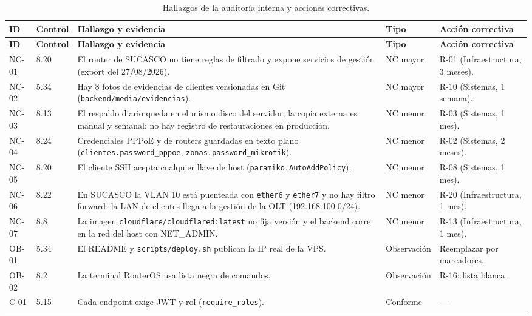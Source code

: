 {\small
\begin{longtable}{L{1.0cm}L{1.0cm}L{6.1cm}L{2.0cm}L{3.1cm}}
\caption{Hallazgos de la auditoría interna y acciones correctivas.}\label{tab:ce03-sgsi-hallazgos}\\
\toprule
\textbf{ID} & \textbf{Control} & \textbf{Hallazgo y evidencia} & \textbf{Tipo} & \textbf{Acción correctiva} \\
\midrule
\endfirsthead
\toprule
\textbf{ID} & \textbf{Control} & \textbf{Hallazgo y evidencia} & \textbf{Tipo} & \textbf{Acción correctiva} \\
\midrule
\endhead
\bottomrule
\endlastfoot
NC-01 & 8.20 & El router de SUCASCO no tiene reglas de filtrado y expone servicios de gestión (export del 27/08/2026). & NC mayor & R-01 (Infraestructura, 3 meses). \\
NC-02 & 5.34 & Hay 8 fotos de evidencias de clientes versionadas en Git (\texttt{backend/media/evidencias}). & NC mayor & R-10 (Sistemas, 1 semana). \\
NC-03 & 8.13 & El respaldo diario queda en el mismo disco del servidor; la copia externa es manual y semanal; no hay registro de restauraciones en producción. & NC menor & R-03 (Sistemas, 1 mes). \\
NC-04 & 8.24 & Credenciales PPPoE y de routers guardadas en texto plano (\texttt{clientes.password\_pppoe}, \texttt{zonas.password\_mikrotik}). & NC menor & R-02 (Sistemas, 2 meses). \\
NC-05 & 8.20 & El cliente SSH acepta cualquier llave de host (\texttt{paramiko.AutoAddPolicy}). & NC menor & R-08 (Sistemas, 1 mes). \\
NC-06 & 8.22 & En SUCASCO la VLAN 10 está puenteada con \texttt{ether6} y \texttt{ether7} y no hay filtro forward: la LAN de clientes llega a la gestión de la OLT (192.168.100.0/24). & NC menor & R-20 (Infraestructura, 1 mes). \\
NC-07 & 8.8 & La imagen \texttt{cloudflare/cloudflared:latest} no fija versión y el backend corre en la red del host con NET\_ADMIN. & NC menor & R-13 (Infraestructura, 1 mes). \\
OB-01 & 5.34 & El README y \texttt{scripts/deploy.sh} publican la IP real de la VPS. & Observación & Reemplazar por marcadores. \\
OB-02 & 8.2 & La terminal RouterOS usa lista negra de comandos. & Observación & R-16: lista blanca. \\
C-01 & 5.15 & Cada endpoint exige JWT y rol (\texttt{require\_roles}). & Conforme & --- \\

\end{longtable}}
